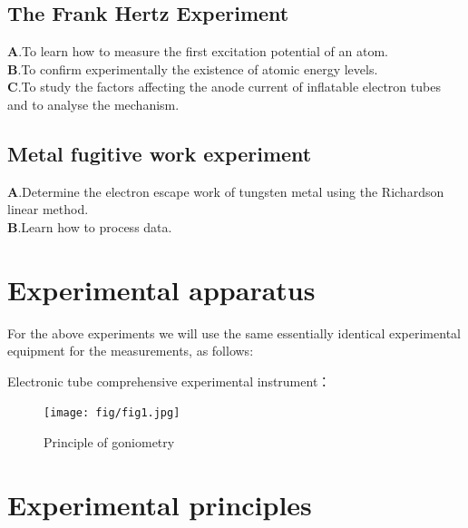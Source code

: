 \documentclass[UTF8]{article}
\begin{document}
	\subsection{The Frank Hertz Experiment}
   $\bm{A}$.To learn how to measure the first excitation potential of an atom.\\
   $\bm{B}$.To confirm experimentally the existence of atomic energy levels.\\
   $\bm{C}$.To study the factors affecting the anode current of inflatable electron tubes and to analyse the mechanism.
   
   \subsection{Metal fugitive work experiment}
      $\bm{A}$.Determine the electron escape work of tungsten metal using the Richardson linear method.\\
      $\bm{B}$.Learn how to process data.\\

	\section{Experimental apparatus}
	For the above experiments we will use the same essentially identical experimental equipment for the measurements, as follows:
	
	Electronic tube comprehensive experimental instrument：
		\begin{figure}[H]
	\centering
	\texttt{[image: fig/fig1.jpg]}
    \caption{Principle of goniometry}
    \label{figure.9}
        \end{figure} 
      
	\section{Experimental principles}   
\end{document}
